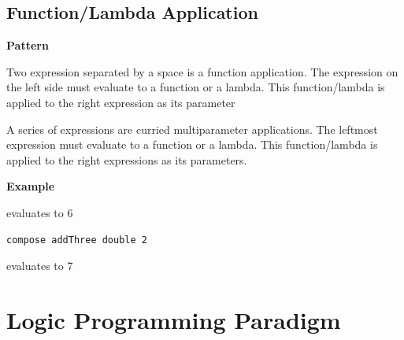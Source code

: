 \section{Function/Lambda
Application}\label{haskell-cheat-sheet.md__functionlambda-application}

\textbf{Pattern}

Two expression separated by a space is a function application. The
expression on the left side must evaluate to a function or a lambda.
This function/lambda is applied to the right expression as its parameter

\begin{Shaded}
\begin{Highlighting}[]
\OperatorTok{\textless{}}\OperatorTok{\textgreater{}} \OperatorTok{\textless{}}\OperatorTok{\textgreater{}}
\end{Highlighting}
\end{Shaded}

A series of expressions are curried multiparameter applications. The
leftmost expression must evaluate to a function or a lambda. This
function/lambda is applied to the right expressions as its parameters.

\begin{Shaded}
\begin{Highlighting}[]
\OperatorTok{\textless{}}\OperatorTok{\textgreater{}} \OperatorTok{\textless{}}\OperatorTok{\textgreater{}} \OperatorTok{\textless{}}\OperatorTok{\textgreater{}}  \OperatorTok{\textless{}}\OperatorTok{\textgreater{}}
\end{Highlighting}
\end{Shaded}

\textbf{Example}

\begin{Shaded}
\begin{Highlighting}[]
\end{Highlighting}
\end{Shaded}

evaluates to 6

\begin{verbatim}
compose addThree double 2
\end{verbatim}

evaluates to 7

\chapter{Logic Programming
Paradigm}\label{logic-programming-paradigm.md__logic-programming-paradigm}

